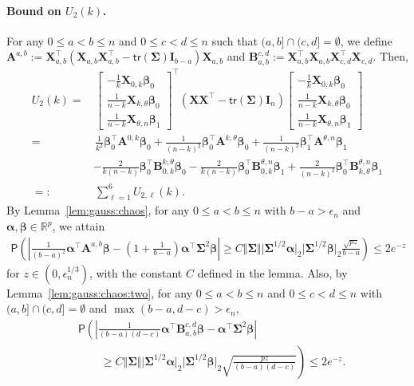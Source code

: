 \documentclass[11pt, a4paper]{article}
\newcommand{\mbf}{\mathbf}
\newcommand{\bmx}{\begin{bmatrix}}
\newcommand{\emx}{\end{bmatrix}}
\newcommand{\eps}{\epsilon}
\renewcommand{\l}{\left}
\renewcommand{\r}{\right}
\newcommand{\cp}{\theta}
\newcommand{\tr}[0]{\mathsf{tr}}
\newcommand{\p}{\mathsf{P}}
\newcommand{\R}{\mathbb{R}}
\theoremstyle{definition}
\theoremstyle{definition}
\theoremstyle{definition}
\theoremstyle{definition}
\theoremstyle{definition}
\theoremstyle{remark}
\theoremstyle{definition}
\theoremstyle{definition}
\theoremstyle{definition}
\begin{document}
\paragraph{Bound on $U_2(k)$.}
For any $0 \le a < b \le n$ and $0 \le c < d \le n$ such that  $(a, b] \cap (c, d] = \emptyset$, we define $\mbf A^{a, b} := \mbf X_{a, b}^\top (\mbf X_{a, b} \mbf X_{a, b}^\top - \tr(\bm\Sigma) \mbf I_{b - a}) \mbf X_{a, b}$ and $\mbf B_{a, b}^{c, d} := \mbf X_{a, b}^\top \mbf X_{a, b} \mbf X_{c, d}^\top \mbf X_{c, d}$.
Then, 
\begin{align*}
U_2(k) =& \, \bmx - \frac{1}{k} \mbf X_{0, k} \bm\beta_0 \\ \frac{1}{n - k} \mbf X_{k, \cp} \bm\beta_0 \\ \frac{1}{n - k} \mbf X_{\cp, n} \bm\beta_1 \emx^\top \l( \mbf X\mbf X^\top - \tr(\bm\Sigma) \mbf I_n \r) \bmx - \frac{1}{k} \mbf X_{0, k} \bm\beta_0 \\ \frac{1}{n - k} \mbf X_{k, \cp} \bm\beta_0 \\ \frac{1}{n - k} \mbf X_{\cp, n} \bm\beta_1 \emx
\\
=& \, \frac{1}{k^2} \bm\beta_0^\top \mbf A^{0, k} \bm\beta_0 + \frac{1}{(n - k)^2} \bm\beta_0^\top \mbf A^{k, \cp} \bm\beta_0 + \frac{1}{(n - k)^2} \bm\beta_1^\top \mbf A^{\cp, n} \bm\beta_1
\\
& - \frac{2}{k (n - k)} \bm\beta_0^\top \mbf B_{0, k}^{k, \cp} \bm\beta_0
- \frac{2}{k (n - k)} \bm\beta_0^\top \mbf B_{0, k}^{\cp, n} \bm\beta_1
+ \frac{2}{(n - k)^2} \bm\beta_0^\top \mbf B_{k, \cp}^{\cp, n} \bm\beta_1
\\
=:& \, \sum_{\ell = 1}^6 U_{2, \ell}(k).
\end{align*}
By Lemma~\ref{lem:gauss:chaos}, for any $0 \le a < b \le n$ with $b - a > \eps_n$ and $\bm\alpha, \bm\beta \in \R^p$, we attain
\begin{align*}
\p\l( \l\vert \frac{1}{(b - a)^2} \bm\alpha^\top \mbf A^{a, b} \bm\beta - \l(1 + \frac{1}{b - a} \r) \bm\alpha^\top \bm\Sigma^2 \bm\beta \r\vert \ge C \Vert \bm\Sigma \Vert \vert \bm\Sigma^{1/2} \bm\alpha \vert_2 \vert \bm\Sigma^{1/2} \bm\beta \vert_2 \frac{\sqrt{pz}}{b - a} \r) \le 2 e^{-z}
\end{align*}
for $z \in (0, \eps_n^{1/3})$, with the constant $C$ defined in the lemma.
Also, by Lemma~\ref{lem:gauss:chaos:two}, for any $0 \le a < b \le n$ and $0 \le c < d \le n$ with $(a, b] \cap (c, d] = \emptyset$ and $\max(b - a, d - c) > \eps_n$, 
\begin{align*}
& \p\l( \l\vert \frac{1}{(b - a)(d - c)} \bm\alpha^\top \mbf B_{a, b}^{c, d} \bm\beta - \bm\alpha^\top \bm\Sigma^2 \bm\beta \r\vert \r. 
\\
& \qquad \l. \ge C \Vert \bm\Sigma \Vert \vert \bm\Sigma^{1/2} \bm\alpha \vert_2 \vert \bm\Sigma^{1/2} \bm\beta \vert_2 \sqrt{\frac{pz}{(b - a)(d - c)}} \r) \le 2 e^{-z}.
\end{align*}
\end{document}
